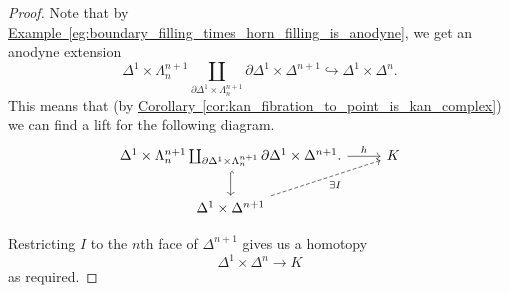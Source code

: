 \documentclass[main.tex]{subfiles}
\begin{document}
\begin{proof}
  Note that by \hyperref[eg:boundary_filling_times_horn_filling_is_anodyne]{Example~\ref*{eg:boundary_filling_times_horn_filling_is_anodyne}}, we get an anodyne extension
  \begin{equation*}
    \Delta^{1} \times \Lambda^{n+1}_{n} \coprod_{\partial \Delta^{1} \times \Lambda^{n+1}_{n}} \partial \Delta^{1} \times \Delta^{n+1} \hookrightarrow \Delta^{1} \times \Delta^{n}.
  \end{equation*}
  This means that (by \hyperref[cor:kan_fibration_to_point_is_kan_complex]{Corollary~\ref*{cor:kan_fibration_to_point_is_kan_complex}}) we can find a lift for the following diagram.
  \begin{equation*}
    \begin{tikzcd}
      \Delta^{1} \times \Lambda^{n+1}_{n} \coprod_{\partial \Delta^{1} \times \Lambda^{n+1}_{n}} \partial \Delta^{1} \times \Delta^{n+1}.
      \arrow[r, "h"]
      \arrow[d, hookrightarrow]
      & K
      \\
      \Delta^{1} \times \Delta^{n+1}
      \arrow[ur, dashed, swap, "\exists I"]
    \end{tikzcd}
  \end{equation*}

  Restricting $I$ to the $n$th face of $\Delta^{n+1}$ gives us a homotopy
  \begin{equation*}
    \Delta^{1} \times \Delta^{n} \to K
  \end{equation*}
  as required.
\end{proof}
\end{document}
